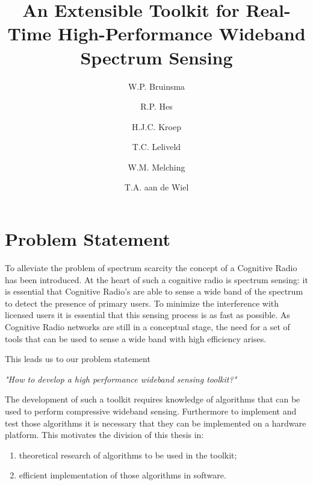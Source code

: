 \documentclass[a4paper, openany, oneside]{memoir}
\title{An Extensible Toolkit for Real-Time High-Performance Wideband Spectrum Sensing}
\author{W.P. Bruinsma \and R.P. Hes \and H.J.C. Kroep \and T.C. Leliveld \and W.M. Melching \and T.A. aan de Wiel}
\begin{document}
\chapter{Problem Statement} \label{cha:problem_statement}
To alleviate the problem of spectrum scarcity the concept of a Cognitive Radio has been introduced.
At the heart of such a cognitive radio is spectrum sensing: it is essential that Cognitive Radio's are able to sense a wide band of the spectrum to detect the presence of primary users. To minimize the interference with licensed users it is essential that this sensing process is as fast as possible. As Cognitive Radio networks are still in a conceptual stage, the need for a set of tools that can be used to sense a wide band with high efficiency arises.

This leads us to our problem statement 

\emph{"How to develop a high performance wideband sensing toolkit?"}

The development of such a toolkit requires knowledge of algorithms that can be used to perform compressive wideband sensing. Furthermore
to implement and test those algorithms it is necessary that they can be implemented on a hardware platform. This motivates the division of this thesis in:

\begin{enumerate}
	\item theoretical research of algorithms to be used in the toolkit;
	\item efficient implementation of those algorithms  in software.
\end{enumerate}
\end{document}
